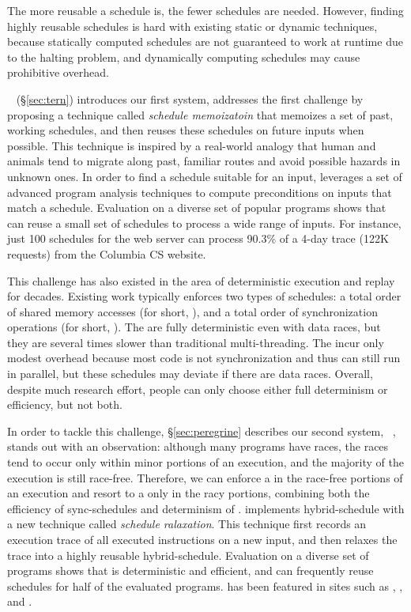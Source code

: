  The more reusable a schedule is, the fewer schedules are needed. However, finding highly reusable schedules is hard with existing static or dynamic techniques, because statically computed schedules are not guaranteed to work at runtime due to the halting problem, and dynamically computing schedules may cause prohibitive overhead.

\tern~\cite{cui:tern:osdi10} (\S\ref{sec:tern}) introduces our first \smt system, addresses the first challenge by proposing a technique called \emph{schedule memoizatoin} that memoizes a set of past, working schedules, and then 
reuses these schedules on future inputs when possible. This technique is inspired
by a real-world analogy that human and animals tend to migrate along past, familiar routes
and avoid possible hazards in unknown ones. In order to find a schedule 
suitable for an input, \tern leverages a set of advanced program 
analysis techniques to compute preconditions on inputs that match a schedule. 
Evaluation on a diverse set of popular programs shows that \tern can
reuse a small set of schedules to process a wide range of inputs. For 
instance, just 100 schedules for the \apache web server can process 90.3\% of a 4-day 
trace (122K requests) from the Columbia CS website.

 This challenge has also existed in the area of deterministic execution and replay for decades. Existing work typically enforces two types of schedules: a total order of shared memory accesses (for short, \memsched), and a total order of synchronization operations (for 
short, \syncsched). The \memscheds are fully deterministic even with 
data races, but they are several times slower than traditional multi-threading.
The \syncscheds incur only modest overhead because most code is 
not synchronization and thus can still run in parallel, but these schedules may deviate if there are data races. Overall, despite much research effort, people can only choose either full determinism or efficiency, but not both.

In order to tackle this challenge,  \S\ref{sec:peregrine} describes our second \smt system, \peregrine~\cite{peregrine:sosp11}, 
stands out with an observation: although many programs have races, the 
races tend to occur only within minor portions of an execution, and the 
majority of the execution is still race-free. Therefore, we can enforce a \syncscheds
in the race-free portions of an execution and resort to a \memsched only in the racy portions,
combining both the efficiency of sync-schedules and determinism of \memscheds. 
\peregrine implements hybrid-schedule with
a new technique called \emph{schedule ralaxation}. This technique first records an execution 
trace of all executed instructions on a new input, and then relaxes 
the trace into a highly reusable hybrid-schedule. Evaluation on a diverse set of programs shows that 
\peregrine is deterministic and efficient, and can frequently reuse schedules 
for half of the evaluated programs. \peregrine has been featured in sites such 
as \acmtechnews, \tgdaily, and \physorg.

